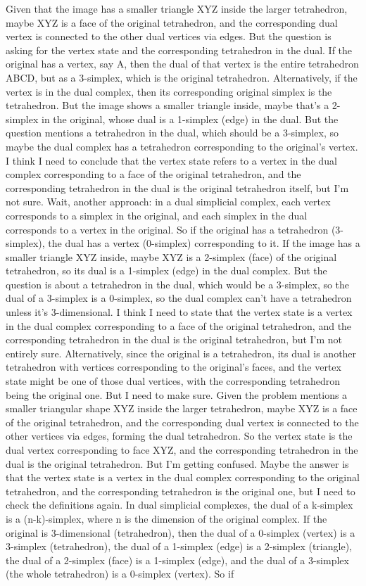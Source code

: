 Given that the image has a smaller triangle XYZ inside the larger tetrahedron, maybe XYZ is a face of the original tetrahedron, and the corresponding dual vertex is connected to the other dual vertices via edges. But the question is asking for the vertex state and the corresponding tetrahedron in the dual. If the original has a vertex, say A, then the dual of that vertex is the entire tetrahedron ABCD, but as a 3-simplex, which is the original tetrahedron. Alternatively, if the vertex is in the dual complex, then its corresponding original simplex is the tetrahedron. But the image shows a smaller triangle inside, maybe that's a 2-simplex in the original, whose dual is a 1-simplex (edge) in the dual. But the question mentions a tetrahedron in the dual, which should be a 3-simplex, so maybe the dual complex has a tetrahedron corresponding to the original's vertex. I think I need to conclude that the vertex state refers to a vertex in the dual complex corresponding to a face of the original tetrahedron, and the corresponding tetrahedron in the dual is the original tetrahedron itself, but I'm not sure. Wait, another approach: in a dual simplicial complex, each vertex corresponds to a simplex in the original, and each simplex in the dual corresponds to a vertex in the original. So if the original has a tetrahedron (3-simplex), the dual has a vertex (0-simplex) corresponding to it. If the image has a smaller triangle XYZ inside, maybe XYZ is a 2-simplex (face) of the original tetrahedron, so its dual is a 1-simplex (edge) in the dual complex. But the question is about a tetrahedron in the dual, which would be a 3-simplex, so the dual of a 3-simplex is a 0-simplex, so the dual complex can't have a tetrahedron unless it's 3-dimensional. I think I need to state that the vertex state is a vertex in the dual complex corresponding to a face of the original tetrahedron, and the corresponding tetrahedron in the dual is the original tetrahedron, but I'm not entirely sure. Alternatively, since the original is a tetrahedron, its dual is another tetrahedron with vertices corresponding to the original's faces, and the vertex state might be one of those dual vertices, with the corresponding tetrahedron being the original one. But I need to make sure. Given the problem mentions a smaller triangular shape XYZ inside the larger tetrahedron, maybe XYZ is a face of the original tetrahedron, and the corresponding dual vertex is connected to the other vertices via edges, forming the dual tetrahedron. So the vertex state is the dual vertex corresponding to face XYZ, and the corresponding tetrahedron in the dual is the original tetrahedron. But I'm getting confused. Maybe the answer is that the vertex state is a vertex in the dual complex corresponding to the original tetrahedron, and the corresponding tetrahedron is the original one, but I need to check the definitions again. In dual simplicial complexes, the dual of a k-simplex is a (n-k)-simplex, where n is the dimension of the original complex. If the original is 3-dimensional (tetrahedron), then the dual of a 0-simplex (vertex) is a 3-simplex (tetrahedron), the dual of a 1-simplex (edge) is a 2-simplex (triangle), the dual of a 2-simplex (face) is a 1-simplex (edge), and the dual of a 3-simplex (the whole tetrahedron) is a 0-simplex (vertex). So if 
